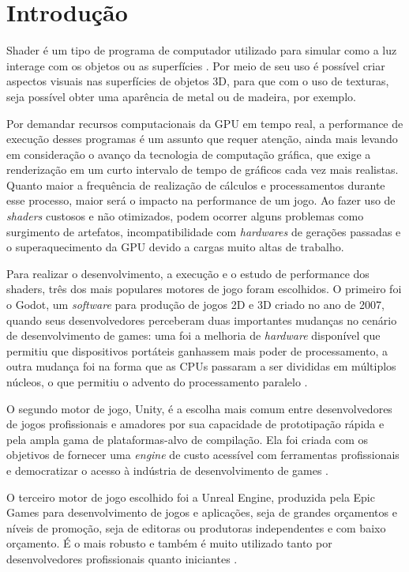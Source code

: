 \chapter{Introdução}
\label{cap:introducao}

Shader é um tipo de programa de computador utilizado para simular como a luz interage com os objetos ou as superfícies \cite{unityShaders}. Por meio de seu uso é possível criar aspectos visuais nas superfícies de objetos 3D, para que com o uso de texturas, seja possível obter uma aparência de metal ou de madeira, por exemplo.

Por demandar recursos computacionais da GPU em tempo real, a performance de execução desses programas é um assunto que requer atenção, ainda mais levando em consideração o avanço da tecnologia de computação gráfica, que exige a renderização em um curto intervalo de tempo de gráficos cada vez mais realistas. Quanto maior a frequência de realização de cálculos e processamentos durante esse processo, maior será o impacto na performance de um jogo. Ao fazer uso de \textit{shaders} custosos e não otimizados, podem ocorrer alguns problemas como surgimento de artefatos, incompatibilidade com \textit{hardwares} de gerações passadas e o superaquecimento da GPU devido a cargas muito altas de trabalho. 

Para realizar o desenvolvimento, a execução e o estudo de performance dos shaders, três dos mais populares motores de jogo foram escolhidos. O primeiro foi o Godot, um \textit{software} para produção de jogos 2D e 3D criado no ano de 2007, quando seus desenvolvedores perceberam duas importantes mudanças no cenário de desenvolvimento de games: uma foi a melhoria de \textit{hardware} disponível que permitiu que dispositivos portáteis ganhassem mais poder de processamento, a outra mudança foi na forma que as CPUs passaram a ser divididas em múltiplos núcleos, o que permitiu o advento do processamento paralelo \cite{godotEngine}.

O segundo motor de jogo, Unity, é a escolha mais comum entre desenvolvedores de jogos profissionais e amadores por sua capacidade de prototipação rápida e pela ampla gama de plataformas-alvo de compilação. Ela foi criada com os objetivos de fornecer uma \textit{engine} de custo acessível com ferramentas profissionais e democratizar o acesso à indústria de desenvolvimento de games \cite{unityHistory}.

O terceiro motor de jogo escolhido foi a Unreal Engine, produzida pela Epic Games para desenvolvimento de jogos e aplicações, seja de grandes orçamentos e níveis de promoção, seja de editoras ou produtoras independentes e com baixo orçamento. É o mais robusto e também é muito utilizado tanto por desenvolvedores profissionais quanto iniciantes \cite{unrealEngine}.

